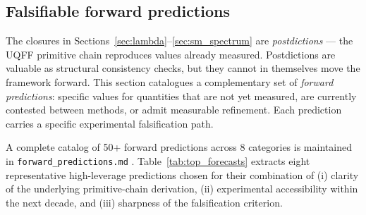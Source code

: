 
\subsection{Falsifiable forward predictions}
\label{sec:forecasts}

The closures in Sections~\ref{sec:lambda}--\ref{sec:sm_spectrum} are
\emph{postdictions} --- the UQFF primitive chain reproduces values
already measured. Postdictions are valuable as structural consistency
checks, but they cannot in themselves move the framework forward.
This section catalogues a complementary set of \emph{forward predictions}:
specific values for quantities that are not yet measured, are currently
contested between methods, or admit measurable refinement. Each
prediction carries a specific experimental falsification path.

A complete catalog of 50+ forward predictions across 8 categories is
maintained in \texttt{forward\_predictions.md} \cite{Murphy_StarMagic_Software}.
Table~\ref{tab:top_forecasts} extracts eight representative
high-leverage predictions chosen for their combination of (i) clarity
of the underlying primitive-chain derivation, (ii) experimental
accessibility within the next decade, and (iii) sharpness of the
falsification criterion.

